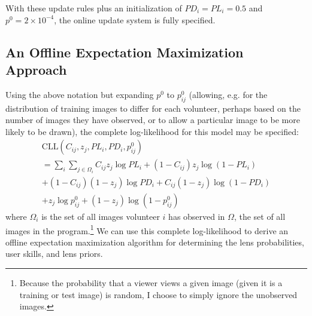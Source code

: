 \documentclass[useAMS,usenatbib,a4paper]{mn2e}
\begin{document}
With these update rules plus an initialization of $PD_{i} = PL_{i} = 0.5$ and
$p^{0} = 2 \times 10^{-4}$, the online update system is fully specified.


\subsection{An Offline Expectation Maximization Approach}
\label{sec:formalism:em}
Using the above notation but expanding $p^{0}$ to $p_{ij}^{0}$ (allowing, e.g. for
the distribution of training images to differ for each volunteer, perhaps based on
the number of images they have observed, or to allow a particular image to be
more likely to be drawn), the complete log-likelihood for this model may be
specified:
\begin{multline}
  \mathrm{CLL}(C_{ij}, z_{j}, PL_{i}, PD_{i}, p_{ij}^{0}) \\ = \sum_{i} \sum_{j \in \Omega_i} C_{ij} z_{j} \log PL_{i} +
      (1 - C_{ij}) z_j \log (1 -
      PL_{i}) \\ + (1 - C_{ij}) (1 - z_j) \log PD_{i} + C_{ij} (1 - z_j) \log (1 - PD_{i}) \\ + z_j \log p_{ij}^{0} +
      (1 - z_j ) \log(1 - p_{ij}^{0})
\end{multline}
where $\Omega_i$ is the set of all images volunteer $i$ has observed in $\Omega$,
the set of all images in the program.\footnote{Because the probability that a
  viewer views a given image (given it is a training or test image) is random,
I choose to simply ignore the unobserved images.} We can use this complete
log-likelihood to derive an offline expectation maximization algorithm for
determining the lens probabilities, user skills, and lens priors.

\end{document}
